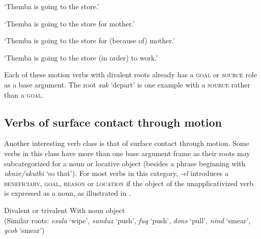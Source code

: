 \documentclass[output=paper]{langsci/langscibook}
\begin{document}
\glt ‘Themba is going to the store.’


\glt ‘Themba is going to the store for mother.’


\glt ‘Themba is going to the store for (because of) mother.’


\glt ‘Themba is going to the store (in order) to work.’
\z
\z


Each of these motion verbs with divalent roots already has a \textsc{goal} or \textsc{source} role as a base argument. The root \textit{suk} ‘depart’ is one example with a \textsc{source} rather than a \textsc{goal}.

\subsection{Verbs of surface contact through motion}\label{sec:sibanda:4.2}

Another interesting verb class is that of surface contact through motion. Some verbs in this class have more than one base argument frame as their roots may subcategorized for a noun or locative object (besides a phrase beginning with \textit{ukuze/ukuthi} ‘so that’). For most verbs in this category, \textit{-el} introduces a \textsc{beneficiary}, \textsc{goal}, \textsc{reason} or \textsc{location} if the object of the unapplicativized verb is expressed as a noun, as illustrated in . 

\ea\label{ex:sibanda:8}
\settowidth{}
{Divalent or trivalent With noun object}\\
 (Similar roots: \textit{esula} ‘wipe’, \textit{sunduz} ‘push’, \textit{fuq} ‘push’, \textit{dons} ‘pull’, \textit{nind} ‘smear’, \textit{gcob} ‘smear’)\\
\end{document}
